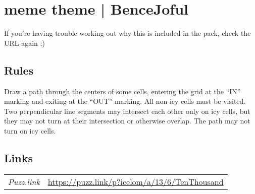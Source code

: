\section{meme theme | {\normalfont BenceJoful}}
\label{sec:49-meme-theme-bencejoful}
If you're having trouble working out why this is included in the pack, check the URL again ;)
\subsection*{Rules}
\begin{markdown}
Draw a path through the centers of some cells, entering the grid at the “IN” marking and exiting at the “OUT” marking. All non-icy cells must be visited. Two perpendicular line segments may intersect each other only on icy cells, but they may not turn at their intersection or otherwise overlap. The path may not turn on icy cells.
\end{markdown}
\subsection*{Links}
\begin{tabularx}{\textwidth}{l X}
\emph{Puzz.link} & \url{https://puzz.link/p?icelom/a/13/6/TenThousand} \\
\end{tabularx}
\pagebreak
